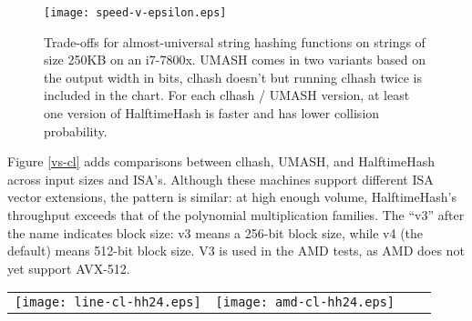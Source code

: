 \documentclass[runningheads]{llncs}
\begin{document}

\begin{figure}
\texttt{[image: speed-v-epsilon.eps]}
\caption{
  \label{frontier}
  Trade-offs for almost-universal string hashing functions on strings of size 250KB on an i7-7800x.
  UMASH comes in two variants based on the output width in bits, clhash doesn't but running clhash twice is included in the chart.
  For each clhash / UMASH version, at least one version of HalftimeHash is faster and has lower collision probability. \protect\cite{layer-of-maxima}
}
\end{figure}

Figure \ref{vs-cl} adds comparisons between clhash, UMASH, and HalftimeHash across input sizes and ISA's.
Although these machines support different ISA vector extensions, the pattern is similar: at high enough volume, HalftimeHash's throughput exceeds that of the polynomial multiplication families.
The ``v3'' after the name indicates block size: v3 means a 256-bit block size, while v4 (the default) means 512-bit block size.
V3 is used in the AMD tests, as AMD does not yet support AVX-512.


\begin{figure*}
\begin{tabular}{cccc}
\texttt{[image: line-cl-hh24.eps]}
&
\texttt{[image: amd-cl-hh24.eps]}
\end{tabular}
\caption{
  \label{vs-cl}
  Comparison of Intel (i7-7800x) and AMD (EC2 c5a.large, 7R32 chip) performance.
  These AMD chips do not support AVX-512, but still HalftimeHash with 256-bit blocks exceeds the speed of clmul-based hashing methods by up to a factor of 2 on long strings.
  In both cases, for long strings, HalftimeHash with 24 bytes of output is faster than clhash and UMASH.
  HalftimeHash24 also has lower collision probability.
}
\end{figure*}
\end{document}
